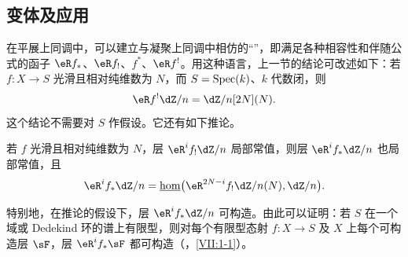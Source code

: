 \subsection{变体及应用}\label{I:6-4}
在平展上同调中，可以建立与凝聚上同调中相仿的“”，即满足各种相容性和伴随公式的函子 $\eR f_*$、$\eR f_!$、$f^*$、$\eR f^!$。用这种语言，上一节的结论可改述如下：若 $f:X\to S$ 光滑且相对纯维数为 $N$，而 $S=\operatorname{Spec}(k)$、$k$ 代数闭，则
\[
\eR f^!\dZ/n=\dZ/n[2N](N).
\]
这个结论不需要对 $S$ 作假设。它还有如下推论。
\begin{corollary}\label{I:6-4-1}
若 $f$ 光滑且相对纯维数为 $N$，层 $\eR^if_!\dZ/n$ 局部常值，则层 $\eR^if_*\dZ/n$ 也局部常值，且
\[
\eR^if_*\dZ/n=\const\hom\bigl(\eR^{2N-i}f_!\dZ/n(N),\dZ/n\bigr).
\]
\end{corollary}
特别地，在推论的假设下，层 $\eR^if_*\dZ/n$ 可构造。由此可以证明：若 $S$ 在一个域或 Dedekind 环的谱上有限型，则对每个有限型态射 $f:X\to S$ 及 $X$ 上每个可构造层 $\sF$，层 $\eR^if_*\sF$ 都可构造（，\ref{VII:1-1}）。

